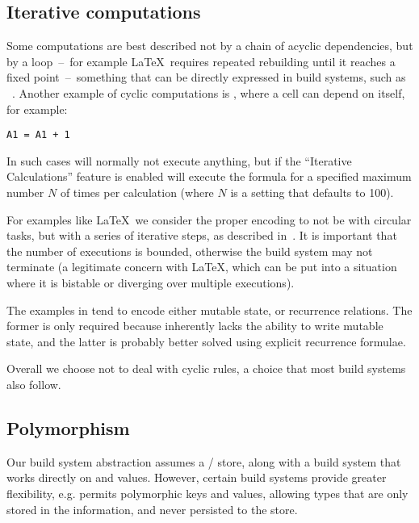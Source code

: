 \subsection{Iterative computations}\label{sec-iterative-compute}

Some computations are best described not by a chain of acyclic dependencies,
but by a loop~--~for example \LaTeX~requires repeated rebuilding until it
reaches a fixed point~--~something that can be directly expressed in build
systems, such as \Pluto~\cite{erdweg2015pluto}. Another example of cyclic
computations is \Excel, where a cell can depend on itself, for example:

\begin{verbatim}
A1 = A1 + 1
\end{verbatim}

\noindent
In such cases \Excel will normally not execute anything, but if the
``Iterative Calculations'' feature is enabled will execute the formula for a
specified maximum number $N$ of times per calculation (where $N$ is a
setting that defaults to 100).

For examples like \LaTeX~we consider the proper encoding to not be with circular
tasks, but with a series of iterative steps, as described
in~\cite{shake-fixed-point}. It is important that the number of executions is
bounded, otherwise the build system may not terminate (a legitimate concern
with \LaTeX, which can be put into a situation where it is bistable or diverging
over multiple executions).

The examples in \Excel tend to encode either mutable state, or recurrence
relations. The former is only required because \Excel inherently lacks the
ability to write mutable state, and the latter is probably better solved using
explicit recurrence formulae.

Overall we choose not to deal with cyclic rules, a choice that most build
systems also follow.

\subsection{Polymorphism}\label{sec-polymorphism}

Our build system abstraction assumes a / store, along with a build
system that works directly on  and  values. However, certain build
systems provide greater flexibility, e.g. \Shake permits polymorphic keys and
values, allowing types that are only stored in the \Shake information, and never
persisted to the store.

